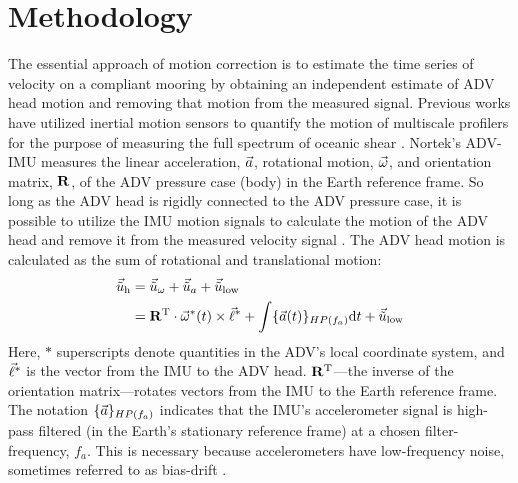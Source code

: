 
\section{Methodology}
\label{sec:methods}


\def\ue{\ensuremath{\vec{\tilde{u}}\earth}}



The essential approach of motion correction is to estimate the time series of velocity on a compliant mooring by obtaining an independent estimate of ADV head motion and removing that motion from the measured signal. Previous works have utilized inertial motion sensors to quantify the motion of multiscale profilers for the purpose of measuring the full spectrum of oceanic shear \cite[]{Winkel++1996}. Nortek's ADV-IMU measures the linear acceleration, ${\vec{a}}$, rotational motion, $\vec{\omega}$, and orientation matrix, $\mathbf{R}$, of the ADV pressure case (body) in the Earth reference frame. So long as the ADV head is rigidly connected to the ADV pressure case, it is possible to utilize the IMU motion signals to calculate the motion of the ADV head and remove it from the measured velocity signal \cite[]{Miller++2008}. The ADV head motion is calculated as the sum of rotational and translational motion:
\begin{align}
  \label{eqn:uhead}
\begin{split}
  \uhead & = \urot + \uacc + \ulow \\
      & = \omatinv \cdot \AngRt^*(t)\times\l + \int \{\Accel(t)\}_{HP(f_{a})} \mathrm{d}t + \ulow
\end{split}
\end{align}
Here, $*$ superscripts denote quantities in the ADV's local coordinate system, and $\vec{\ell}^*$ is the vector from the IMU to the ADV head. $\mathbf{R}^\mathrm{T}$---the inverse of the orientation matrix---rotates vectors from the IMU to the Earth reference frame. The notation $\{{\vec{a}}\}_{HP(f_a)}$ indicates that the IMU's accelerometer signal is high-pass filtered (in the Earth's stationary reference frame) at a chosen filter-frequency, $f_a$. This is necessary because accelerometers have low-frequency noise, sometimes referred to as bias-drift \cite[]{Barshan+Whyte1995, Bevly2004, Gulmammadov2009}.

